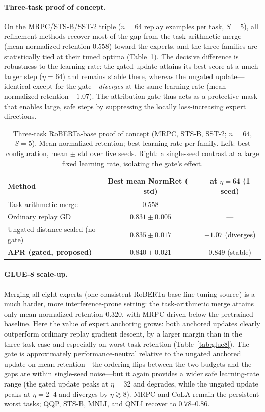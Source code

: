 \documentclass[11pt]{article}
\begin{document}
\paragraph{Three-task proof of concept.}
On the MRPC/STS-B/SST-2 triple ($n=64$ replay examples per task, $S=5$), all refinement methods recover most of the gap from the task-arithmetic merge (mean normalized retention $0.558$) toward the experts, and the three families are statistically tied at their tuned optima (Table~\ref{tab:poc3}). The decisive difference is robustness to the learning rate: the gated update attains its best score at a much larger step ($\eta=64$) and remains stable there, whereas the ungated update---identical except for the gate---\emph{diverges} at the same learning rate (mean normalized retention $-1.07$). The attribution gate thus acts as a protective mask that enables large, safe steps by suppressing the locally loss-increasing expert directions.

\begin{table}[t]
\centering
\caption{Three-task RoBERTa-base proof of concept (MRPC, STS-B, SST-2; $n=64$, $S=5$). Mean normalized retention; best learning rate per family. Left: best configuration, mean $\pm$ std over five seeds. Right: a single-seed contrast at a large fixed learning rate, isolating the gate's effect.}
\label{tab:poc3}
\begin{tabular}{lcc}
\toprule
Method & Best mean NormRet ($\pm$ std) & at $\eta=64$ (1 seed) \\
\midrule
Task-arithmetic merge & $0.558$ & --- \\
Ordinary replay GD & $0.831\pm0.005$ & --- \\
Ungated distance-scaled (no gate) & $0.835\pm0.017$ & $-1.07$ (diverges) \\
\textbf{APR (gated, proposed)} & $\mathbf{0.840\pm0.021}$ & $\mathbf{0.849}$ (stable) \\
\bottomrule
\end{tabular}
\end{table}

\paragraph{GLUE-8 scale-up.}
Merging all eight experts (one consistent RoBERTa-base fine-tuning source) is a much harder, more interference-prone setting: the task-arithmetic merge attains only mean normalized retention $0.320$, with MRPC driven below the pretrained baseline. Here the value of expert anchoring grows: both anchored updates clearly outperform ordinary replay gradient descent, by a larger margin than in the three-task case and especially on worst-task retention (Table~\ref{tab:glue8}). The gate is approximately performance-neutral relative to the ungated anchored update on mean retention---the ordering flips between the two budgets and the gaps are within single-seed noise---but it again provides a wider safe learning-rate range (the gated update peaks at $\eta=32$ and degrades, while the ungated update peaks at $\eta=2\text{--}4$ and diverges by $\eta\gtrsim 8$). MRPC and CoLA remain the persistent worst tasks; QQP, STS-B, MNLI, and QNLI recover to $0.78\text{--}0.86$.
\end{document}
